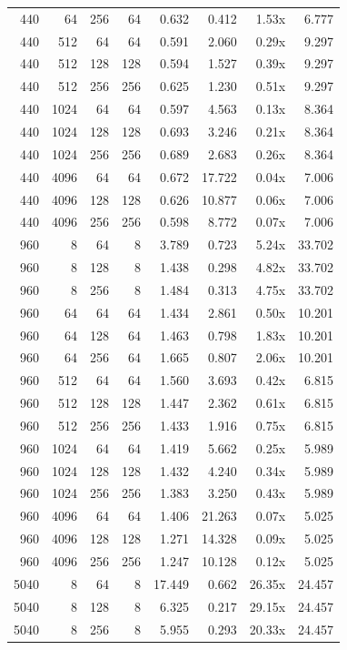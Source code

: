 {\begin{longtable}{rrrrrrrr}
440 & 64 & 256 & 64 & 0.632 & 0.412 & 1.53x & 6.777\\
440 & 512 & 64 & 64 & 0.591 & 2.060 & 0.29x & 9.297\\
440 & 512 & 128 & 128 & 0.594 & 1.527 & 0.39x & 9.297\\
440 & 512 & 256 & 256 & 0.625 & 1.230 & 0.51x & 9.297\\
440 & 1024 & 64 & 64 & 0.597 & 4.563 & 0.13x & 8.364\\
440 & 1024 & 128 & 128 & 0.693 & 3.246 & 0.21x & 8.364\\
440 & 1024 & 256 & 256 & 0.689 & 2.683 & 0.26x & 8.364\\
440 & 4096 & 64 & 64 & 0.672 & 17.722 & 0.04x & 7.006\\
440 & 4096 & 128 & 128 & 0.626 & 10.877 & 0.06x & 7.006\\
440 & 4096 & 256 & 256 & 0.598 & 8.772 & 0.07x & 7.006\\
960 & 8 & 64 & 8 & 3.789 & 0.723 & 5.24x & 33.702\\
960 & 8 & 128 & 8 & 1.438 & 0.298 & 4.82x & 33.702\\
960 & 8 & 256 & 8 & 1.484 & 0.313 & 4.75x & 33.702\\
960 & 64 & 64 & 64 & 1.434 & 2.861 & 0.50x & 10.201\\
960 & 64 & 128 & 64 & 1.463 & 0.798 & 1.83x & 10.201\\
960 & 64 & 256 & 64 & 1.665 & 0.807 & 2.06x & 10.201\\
960 & 512 & 64 & 64 & 1.560 & 3.693 & 0.42x & 6.815\\
960 & 512 & 128 & 128 & 1.447 & 2.362 & 0.61x & 6.815\\
960 & 512 & 256 & 256 & 1.433 & 1.916 & 0.75x & 6.815\\
960 & 1024 & 64 & 64 & 1.419 & 5.662 & 0.25x & 5.989\\
960 & 1024 & 128 & 128 & 1.432 & 4.240 & 0.34x & 5.989\\
960 & 1024 & 256 & 256 & 1.383 & 3.250 & 0.43x & 5.989\\
960 & 4096 & 64 & 64 & 1.406 & 21.263 & 0.07x & 5.025\\
960 & 4096 & 128 & 128 & 1.271 & 14.328 & 0.09x & 5.025\\
960 & 4096 & 256 & 256 & 1.247 & 10.128 & 0.12x & 5.025\\
5040 & 8 & 64 & 8 & 17.449 & 0.662 & 26.35x & 24.457\\
5040 & 8 & 128 & 8 & 6.325 & 0.217 & 29.15x & 24.457\\
5040 & 8 & 256 & 8 & 5.955 & 0.293 & 20.33x & 24.457\\

\end{longtable}}
